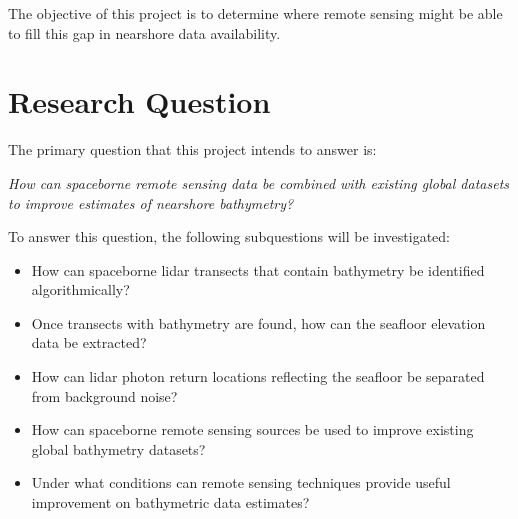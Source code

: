 The objective of this project is to determine where remote sensing might be able to fill this gap in nearshore data availability.

\section{Research Question}
The primary question that this project intends to answer is:

\emph{How can spaceborne remote sensing data be combined with existing global datasets to improve estimates of nearshore bathymetry?}

To answer this question, the following subquestions will be investigated:

\begin{itemize}
      \item How can spaceborne lidar transects that contain bathymetry be identified algorithmically?
      \item Once transects with bathymetry are found, how can the seafloor elevation data be extracted?
      \item How can lidar photon return locations reflecting the seafloor be separated from background noise?
      \item How can spaceborne remote sensing sources be used to improve existing global bathymetry datasets?
      \item Under what conditions can remote sensing techniques provide useful improvement on bathymetric data estimates?
\end{itemize}

